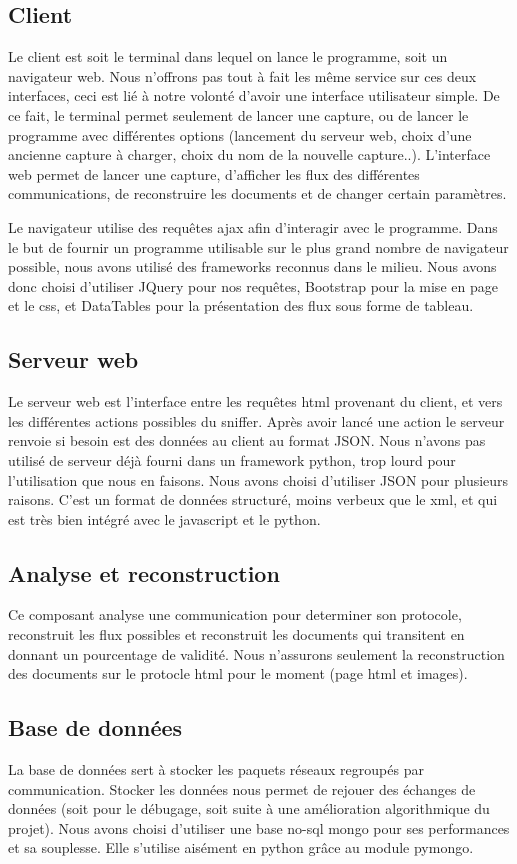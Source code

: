 \subsection{Client}
Le client est soit le terminal dans lequel on lance le programme, soit un navigateur web. Nous n'offrons pas tout à fait les même service sur ces deux interfaces, ceci est lié à notre volonté d'avoir une interface utilisateur simple. 
De ce fait, le terminal permet seulement de lancer une capture, ou de lancer le programme avec différentes options (lancement du serveur web, choix d'une ancienne capture à charger, choix du nom de la nouvelle capture..).
L'interface web permet de lancer une capture, d'afficher les flux des différentes communications, de reconstruire les documents et de changer certain paramètres.

Le navigateur utilise des requêtes ajax afin d'interagir avec  le programme.
Dans le but de fournir un programme utilisable sur le plus grand nombre de navigateur possible, nous avons utilisé des frameworks reconnus dans le milieu. Nous avons donc choisi d'utiliser JQuery pour nos requêtes, Bootstrap pour la mise en page et le css, et DataTables pour la présentation des flux sous forme de tableau. 

\subsection{Serveur web}
Le serveur web est l'interface entre les requêtes html provenant du client, et vers les différentes actions possibles du sniffer. Après avoir lancé une action le serveur renvoie si besoin est des données au client au format
JSON. Nous n'avons pas utilisé de serveur déjà fourni dans un framework python, trop lourd pour l'utilisation que nous en faisons.
Nous avons choisi d'utiliser JSON pour plusieurs raisons. C'est un format de données structuré, moins verbeux que le xml, et qui est très bien intégré avec le javascript et le python. 

\subsection{Analyse et reconstruction}
Ce composant analyse une communication pour determiner son protocole, reconstruit les flux possibles et reconstruit les documents qui transitent en donnant un pourcentage de validité. Nous n'assurons seulement la reconstruction des documents sur le protocle html pour le moment (page html et images).

\subsection{Base de données}
La base de données sert à stocker les paquets réseaux regroupés par communication.	Stocker les données nous permet de rejouer des échanges de données (soit pour le débugage, soit suite à une amélioration algorithmique du projet).	
Nous avons choisi d'utiliser une base no-sql mongo pour ses performances et sa souplesse. Elle s'utilise aisément en python grâce au module pymongo.

